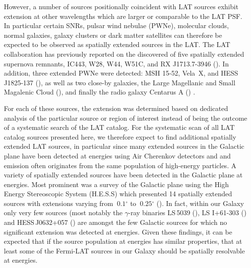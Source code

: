 \documentclass[12pt,preprint]{aastex}
\newcommand{\gev}{\text{GeV}\xspace}
\newcommand{\tev}{\text{TeV}\xspace}
\renewcommand{\deg}{\ensuremath{^\circ}\xspace}
\begin{document}
However, a number of sources positionally coincident with LAT sources
exhibit extension at other wavelengths which are larger or comparable to
the LAT PSF.  In particular certain SNRs, pulsar wind nebulae (PWNe),
molecular clouds, normal galaxies, galaxy clusters or dark matter
satellites can therefore be expected to be observed as spatially extended
sources in the LAT.  The LAT collaboration has previously reported on the
discovered of five spatially extended supernova remnants, IC443, W28, W44,
W51C, and RX J1713.7-3946 (\cite{ic443,w28,w44,w51c,rx_j1713_lat}). In
addition, three extended PWNe were detected: MSH 15-52, Vela~X,
and HESS\,J1825-137 (\cite{msh1552,velax,fermi_hess_j1825}), as well
as two close-by galaxies, the Large Magellanic and Small Magalenic
Cloud (\cite{lmc,smc}), and finally the radio galaxy Centarus A
(\cite{cen_a_lat}) .

For each of these sources, the extension was determined based on
dedicated analysis of the particular source or region of interest
instead of being the outcome of a systematic search of the LAT catalog.
For the systematic scan of all LAT catalog sources presented here, we
therefore expect to find additional spatially extended LAT sources, in
particular since many extended sources in the Galactic plane have been
detected at \tev energies using Air Cherenkov detectors and \tev and
\gev emission often originates from the same population of high-energy
particles.  A variety of spatially extended sources have been detected
in the Galactic plane at \tev energies. Most prominent was a survey of
the Galactic plane using the High Energy Stereoscopic System (H.E.S.S)
which presented 14 spatially extended sources
 with extensions varying from
$~0.1\deg$ to $~0.25\deg$ (\cite{hess_plane_survey}). In fact, within
our Galaxy only very few sources (most notably the $\gamma$-ray binaries
LS\,5039 (\cite{HESSLS5039}), LS I+61-303 (\cite{MAGICLSI, VERITASLSI})
and HESS\,J0632+057 (\cite{HESS0632}) are amongst the few Galactic sources
for which no significant extension was detected at \tev energies. Given
these findings, it can be expected that if the source population at \gev
energies has similar properties, that at least some of the Fermi-LAT
sources in our Galaxy should be spatially resolvable at \gev energies.
\end{document}
